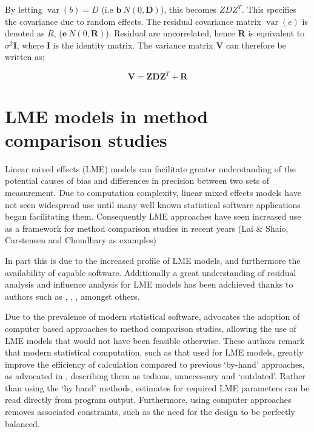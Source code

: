 \documentclass[12pt, a4paper]{report}
\theoremstyle{plain}
\theoremstyle{definition}
\theoremstyle{remark}
\begin{document}
	
	By letting $\operatorname{var}(b) = D$ (i.e $\textbf{b} ~ N(0,\textbf{D})$), this becomes $ZDZ^{T}$. This specifies the covariance due to random
	effects. The residual covariance matrix $\operatorname{var}(e)$ is denoted as $R$, ($\textbf{e} ~ N(0,\textbf{R})$). Residual are uncorrelated,
	hence \textbf{R} is equivalent to $\sigma^{2}$\textbf{I}, where \textbf{I} is the identity matrix. The variance matrix \textbf{V}
	can therefore be written as;
	
	\begin{equation}
	\textbf{V}  = \textbf{ZDZ}^{T} + \textbf{R}
	\end{equation}
	
	


	\section{LME models in method comparison studies}
	Linear mixed effects (LME) models can facilitate greater understanding of the potential causes of bias and differences in precision between two sets of measurement. Due to computation complexity, linear mixed effects models have not seen widespread use until many well known statistical software applications began facilitating them. Consequently LME approaches have seen increased use as a framework for method comparison studies in recent years (Lai $\&$ Shaio, Carstensen and Choudhary as examples)
	
	
	In part this is due to the increased profile of LME models, and furthermore the availability of capable software. 	Additionally a great understanding of residual analysis and influence analysis for LME models has been adchieved thanks to authors such as \citet{schabenberger}, \citet{Christensen}, \citet{cook86} \citet{west}, amongst others.
	
	
	Due to the prevalence of modern statistical software, \citet{BXC2008} advocates the adoption of computer based approaches to method comparison studies, allowing the use of LME models that would not have been feasible otherwise. These authors remark that modern statistical computation, such as that used for LME models, greatly improve the efficiency of
	calculation compared to previous `by-hand' approaches, as advocated in \citet{BA99}, describing them as tedious, unnecessary and `outdated'. Rather than using the `by hand' methods, estimates for required LME parameters can be read directly from program output. Furthermore, using computer approaches removes associated constraints, such as the need for the design to be perfectly balanced.
	
\end{document}
